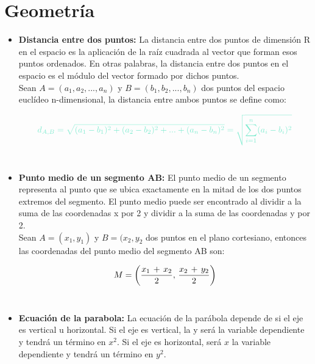 \documentclass[letterpaper, 12pt]{article}
\begin{document}
    \newpage
    
\section{Geometría}

    \begin{itemize}\renewcommand{\labelitemi}{$\chi$}
    
        \item \textbf{Distancia entre dos puntos:} La distancia entre dos puntos de dimensión R en el espacio es la aplicación de la raíz cuadrada al vector que forman esos puntos ordenados. En otras palabras, la distancia entre dos puntos en el espacio es el módulo del vector formado por dichos puntos. \\
        
        Sean  $A=(a_{1}, a_{2}, ... , a_{n}) $ y $B=(b_{1}, b_{2}, ... , b_{n}) $ dos puntos del espacio euclídeo n-dimensional, la distancia entre ambos puntos se define como: 
        
            \begin{equation*}
                \textcolor{mygreen}{d_{A, B} = \sqrt{(a_{1}- b_{1})^2 + (a_{2}- b_{2})^2 + ... + (a_{n}- b_{n})^2} = \sqrt{\sum\limits_{i=1}^{n}(a_{i}- b_{i})^2}}
            \end{equation*}\\
            
        \item \textbf{Punto medio de un segmento AB:} El punto medio de un segmento representa al punto que se ubica exactamente en la mitad de los dos puntos extremos del segmento. El punto medio puede ser encontrado al dividir a la suma de las coordenadas x por 2 y dividir a la suma de las coordenadas y por 2. \\
        
        Sean $A=(x_{1}, y_{1})$ y $B=(x_{2}, y_{2}$ dos puntos en el plano cortesiano, entonces las coordenadas del punto medio del segmento AB son: 
        
            \begin{equation*}
                M = \left( \frac{x_{1} \thinspace + \thinspace x_{2}}{2}, \thinspace \frac{x_{2} \thinspace + \thinspace y_{2}}{2} \right)
            \end{equation*}\\
            
        \item \textbf{Ecuación de la parabola:} La ecuación de la parábola depende de si el eje es vertical u horizontal. Si el eje es vertical, la y será la variable dependiente y tendrá un término en $x^{2}$. Si el eje es horizontal, será $x$ la variable dependiente y tendrá un término en $y^{2}$. \\
        

\end{itemize}
\end{document}
